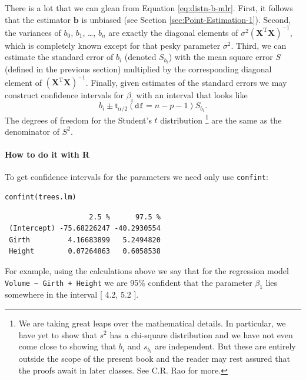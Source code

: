 \documentclass[captions=tableheading]{scrbook}
\begin{document}
There is a lot that we can glean from Equation \ref{eq:distn-b-mlr}. First, it follows that the estimator $\mathbf{b}$ is unbiased (see Section \ref{sec:Point-Estimation-1}). Second, the variances of $b_{0}$, $b_{1}$, \ldots{}, $b_{n}$ are exactly the diagonal elements of $\sigma^{2}\left(\mathbf{X}^{\mathrm{T}}\mathbf{X}\right)^{-1}$, which is completely known except for that pesky parameter $\sigma^{2}$. Third, we can estimate the standard error of $b_{i}$ (denoted $S_{b_{i}}$) with the mean square error $S$ (defined in the previous section) multiplied by the corresponding diagonal element of $\left(\mathbf{X}^{\mathrm{T}}\mathbf{X}\right)^{-1}$. Finally, given estimates of the standard errors we may construct confidence intervals for $\beta_{i}$ with an interval that looks like
\begin{equation}
b_{i}\pm\mathsf{t}_{\alpha/2}(\mathtt{df}=n-p-1)S_{b_{i}}.
\end{equation}
The degrees of freedom for the Student's $t$ distribution
\footnote{We are taking great leaps over the mathematical details. In particular, we have yet to show that $s^{2}$ has a chi-square distribution and we have not even come close to showing that $b_{i}$ and $s_{b_{i}}$ are independent. But these are entirely outside the scope of the present book and the reader may rest assured that the proofs await in later classes. See C.R. Rao for more.}
are the same as the denominator of $S^{2}$. 

\paragraph*{How to do it with \textsf{R}}

To get confidence intervals for the parameters we need only use \texttt{confint}:


\begin{verbatim}
confint(trees.lm)
\end{verbatim}

\begin{verbatim}
                    2.5 %      97.5 %
 (Intercept) -75.68226247 -40.2930554
 Girth         4.16683899   5.2494820
 Height        0.07264863   0.6058538
\end{verbatim}



For example, using the calculations above we say that for the regression model \texttt{Volume \textasciitilde{} Girth + Height} we are 95\% confident that the parameter $\beta_{1}$ lies somewhere in the interval [  4.2,  5.2 ].
\end{document}
